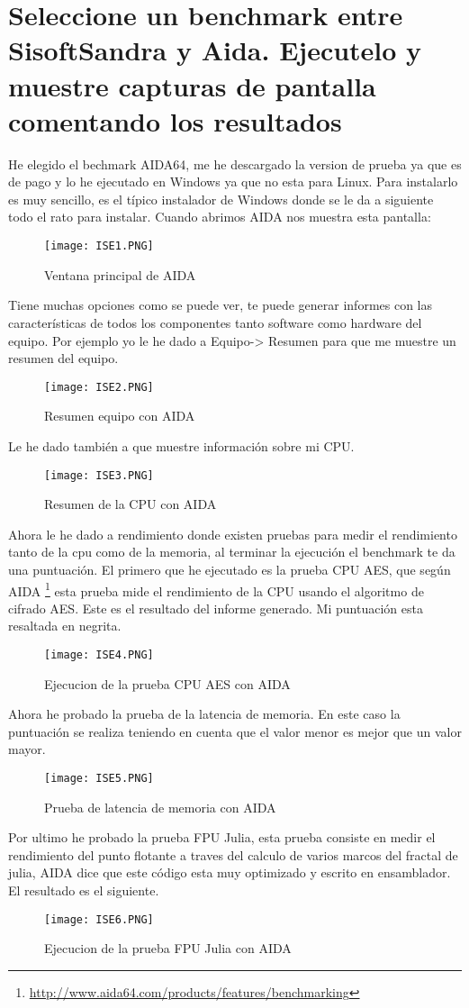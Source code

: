 \section{Seleccione un benchmark entre SisoftSandra y Aida. Ejecutelo y muestre capturas de pantalla comentando los resultados}
He elegido el bechmark AIDA64, me he descargado la version de prueba ya que es de pago y lo he ejecutado en Windows ya que no esta para Linux.
Para instalarlo es muy sencillo, es el típico instalador de Windows donde se le da a siguiente todo el rato para instalar. Cuando abrimos AIDA nos muestra esta pantalla:
\begin{figure}[H] 
\centering
\texttt{[image: ISE1.PNG]}  
\label{figura39:}
\caption{Ventana principal de AIDA}
\end{figure}
Tiene muchas opciones como se puede ver, te puede generar informes con las características de todos los componentes tanto software como hardware del equipo. Por ejemplo yo le he dado a Equipo-> Resumen para que me muestre un resumen del equipo.
\begin{figure}[H] 
\centering
\texttt{[image: ISE2.PNG]}  
\label{figura40:}
\caption{Resumen equipo con AIDA}
\end{figure}
Le he dado también a que muestre información sobre mi CPU.
\begin{figure}[H] 
\centering
\texttt{[image: ISE3.PNG]}  
\label{figura41:}
\caption{Resumen de la CPU con AIDA}
\end{figure}
Ahora le he dado a rendimiento donde existen pruebas para medir el rendimiento tanto de la cpu como de la memoria, al terminar la ejecución el benchmark te da una puntuación.
El primero que he ejecutado es la prueba CPU AES, que según AIDA \footnote{\url{http://www.aida64.com/products/features/benchmarking}}
esta prueba mide el rendimiento de la CPU usando el algoritmo de cifrado AES. Este es el resultado del informe generado. Mi puntuación esta resaltada en negrita.
\begin{figure}[H] 
\centering
\texttt{[image: ISE4.PNG]}  
\label{figura42:}
\caption{Ejecucion de la prueba CPU AES con AIDA}
\end{figure}
Ahora he probado la prueba de la latencia de memoria. En este caso la puntuación se realiza teniendo en cuenta que el valor menor es mejor que un valor mayor.
\begin{figure}[H] 
\centering
\texttt{[image: ISE5.PNG]}  
\label{figura43:}
\caption{Prueba de latencia de memoria con AIDA}
\end{figure}
Por ultimo he probado la prueba FPU Julia, esta prueba consiste en medir el rendimiento del punto flotante a traves del calculo de varios marcos del fractal de julia, AIDA dice que este código esta muy optimizado y escrito en ensamblador. El resultado es el siguiente.
\begin{figure}[H] 
\centering
\texttt{[image: ISE6.PNG]}  
\label{figura44:}
\caption{Ejecucion de la prueba FPU Julia con AIDA}
\end{figure}

